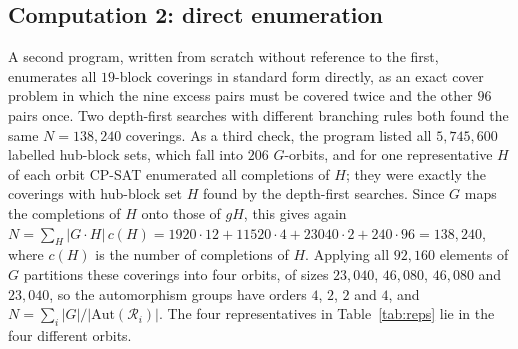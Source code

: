 \documentclass[11pt]{amsart}
\theoremstyle{definition}
\theoremstyle{remark}
\newcommand{\cR}{\mathcal{R}}
\begin{document}
\subsection*{Computation 2: direct enumeration}
A second program, written from scratch without reference to the first,
enumerates all $19$-block coverings in standard form directly, as an exact
cover problem in which the nine excess pairs must be covered twice and the
other $96$ pairs once. Two depth-first searches with different branching rules
both found the same $N=138{,}240$ coverings. As a third check, the program
listed all $5{,}745{,}600$ labelled hub-block sets, which fall into $206$
$G$-orbits, and for one representative $H$ of each orbit CP-SAT enumerated
all completions of $H$; they were exactly the coverings with hub-block set $H$
found by the depth-first searches. Since $G$ maps the completions of $H$ onto
those of $gH$, this gives again $N=\sum_H |G\cdot H|\,c(H)=1920\cdot 12+
11520\cdot 4+23040\cdot 2+240\cdot 96=138{,}240$, where $c(H)$ is the number
of completions of $H$. Applying
all $92{,}160$ elements of $G$ partitions these coverings into four orbits, of
sizes $23{,}040$, $46{,}080$, $46{,}080$ and $23{,}040$, so the automorphism
groups have orders $4$, $2$, $2$ and $4$, and
$N=\sum_i |G|/|\mathrm{Aut}(\cR_i)|$. The four representatives in
Table~\ref{tab:reps} lie in the four different orbits.
\end{document}
